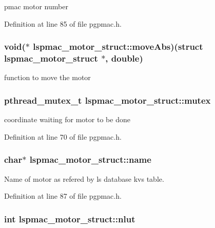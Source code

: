 pmac motor number 

Definition at line 85 of file pgpmac.h.\hypertarget{structlspmac__motor__struct_a20db3de86854b627815b3d940555ea75}{
\subsubsection[{moveAbs}]{\setlength{\rightskip}{0pt plus 5cm}void($\ast$ {\bf lspmac\_\-motor\_\-struct::moveAbs})(struct {\bf lspmac\_\-motor\_\-struct} $\ast$, double)}}
\label{structlspmac__motor__struct_a20db3de86854b627815b3d940555ea75}


function to move the motor \hypertarget{structlspmac__motor__struct_a188c5b1e991750ce2ffd53e0192e0907}{
\subsubsection[{mutex}]{\setlength{\rightskip}{0pt plus 5cm}pthread\_\-mutex\_\-t {\bf lspmac\_\-motor\_\-struct::mutex}}}
\label{structlspmac__motor__struct_a188c5b1e991750ce2ffd53e0192e0907}


coordinate waiting for motor to be done 

Definition at line 70 of file pgpmac.h.\hypertarget{structlspmac__motor__struct_aa90af2f6f1489f1befe1d0891e51575a}{
\subsubsection[{name}]{\setlength{\rightskip}{0pt plus 5cm}char$\ast$ {\bf lspmac\_\-motor\_\-struct::name}}}
\label{structlspmac__motor__struct_aa90af2f6f1489f1befe1d0891e51575a}


Name of motor as refered by ls database kvs table. 

Definition at line 87 of file pgpmac.h.\hypertarget{structlspmac__motor__struct_a11cbc6f50c150ed446e9a901cf7cc12b}{
\subsubsection[{nlut}]{\setlength{\rightskip}{0pt plus 5cm}int {\bf lspmac\_\-motor\_\-struct::nlut}}}
\label{structlspmac__motor__struct_a11cbc6f50c150ed446e9a901cf7cc12b}


